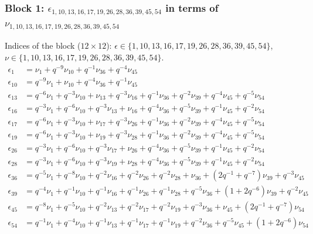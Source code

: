 \subsubsection{Block 1: $\epsilon_{1, 10, 13, 16, 17, 19, 26, 28, 36, 39, 45, 54}$ in terms of $\nu_{1, 10, 13, 16, 17, 19, 26, 28, 36, 39, 45, 54}$}
Indices of the block ($12\times 12$): $\epsilon \in \{1, 10, 13, 16, 17, 19, 26, 28, 36, 39, 45, 54\}$, $\nu \in \{1, 10, 13, 16, 17, 19, 26, 28, 36, 39, 45, 54\}$.
\begin{align*}
\epsilon_{1} &= \nu_{1} + q^{-9}\nu_{10} + q^{-1}\nu_{36} + q^{-4}\nu_{45}\\
\epsilon_{10} &= q^{-9}\nu_{1} + \nu_{10} + q^{-4}\nu_{36} + q^{-1}\nu_{45}\\
\epsilon_{13} &= q^{-6}\nu_{1} + q^{-3}\nu_{10} + \nu_{13} + q^{-3}\nu_{16} + q^{-1}\nu_{36} + q^{-2}\nu_{39} + q^{-4}\nu_{45} + q^{-5}\nu_{54}\\
\epsilon_{16} &= q^{-3}\nu_{1} + q^{-6}\nu_{10} + q^{-3}\nu_{13} + \nu_{16} + q^{-4}\nu_{36} + q^{-5}\nu_{39} + q^{-1}\nu_{45} + q^{-2}\nu_{54}\\
\epsilon_{17} &= q^{-6}\nu_{1} + q^{-3}\nu_{10} + \nu_{17} + q^{-3}\nu_{26} + q^{-1}\nu_{36} + q^{-2}\nu_{39} + q^{-4}\nu_{45} + q^{-5}\nu_{54}\\
\epsilon_{19} &= q^{-6}\nu_{1} + q^{-3}\nu_{10} + \nu_{19} + q^{-3}\nu_{28} + q^{-1}\nu_{36} + q^{-2}\nu_{39} + q^{-4}\nu_{45} + q^{-5}\nu_{54}\\
\epsilon_{26} &= q^{-3}\nu_{1} + q^{-6}\nu_{10} + q^{-3}\nu_{17} + \nu_{26} + q^{-4}\nu_{36} + q^{-5}\nu_{39} + q^{-1}\nu_{45} + q^{-2}\nu_{54}\\
\epsilon_{28} &= q^{-3}\nu_{1} + q^{-6}\nu_{10} + q^{-3}\nu_{19} + \nu_{28} + q^{-4}\nu_{36} + q^{-5}\nu_{39} + q^{-1}\nu_{45} + q^{-2}\nu_{54}\\
\epsilon_{36} &= q^{-5}\nu_{1} + q^{-8}\nu_{10} + q^{-2}\nu_{16} + q^{-2}\nu_{26} + q^{-2}\nu_{28} + \nu_{36} + (2q^{-1}+q^{-7})\nu_{39} + q^{-3}\nu_{45}\\
\epsilon_{39} &= q^{-4}\nu_{1} + q^{-1}\nu_{10} + q^{-1}\nu_{16} + q^{-1}\nu_{26} + q^{-1}\nu_{28} + q^{-5}\nu_{36} + (1+2q^{-6})\nu_{39} + q^{-2}\nu_{45}\\
\epsilon_{45} &= q^{-8}\nu_{1} + q^{-5}\nu_{10} + q^{-2}\nu_{13} + q^{-2}\nu_{17} + q^{-2}\nu_{19} + q^{-3}\nu_{36} + \nu_{45} + (2q^{-1}+q^{-7})\nu_{54}\\
\epsilon_{54} &= q^{-1}\nu_{1} + q^{-4}\nu_{10} + q^{-1}\nu_{13} + q^{-1}\nu_{17} + q^{-1}\nu_{19} + q^{-2}\nu_{36} + q^{-5}\nu_{45} + (1+2q^{-6})\nu_{54}
\end{align*}


